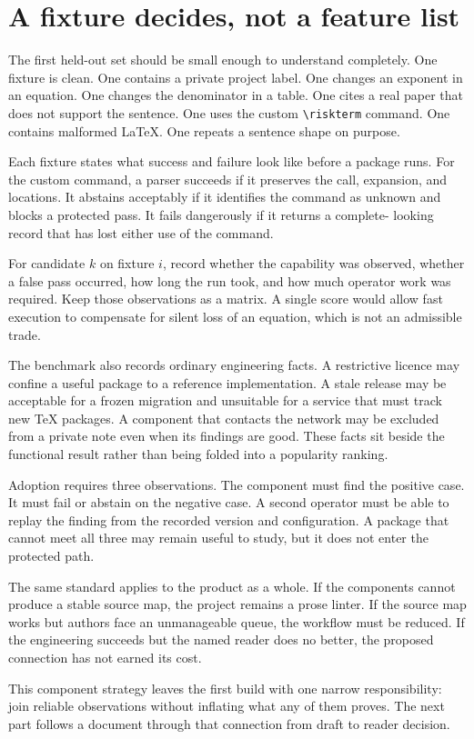 \clearpage
\section{A fixture decides, not a feature list}
\label{sec:component-fixture}

The first held-out set should be small enough to understand completely. One
fixture is clean. One contains a private project label. One changes an exponent
in an equation. One changes the denominator in a table. One cites a real paper
that does not support the sentence. One uses the custom \verb|\riskterm|
command. One contains malformed LaTeX. One repeats a sentence shape on purpose.

Each fixture states what success and failure look like before a package runs.
For the custom command, a parser succeeds if it preserves the call, expansion,
and locations. It abstains acceptably if it identifies the command as unknown
and blocks a protected pass. It fails dangerously if it returns a complete-
looking record that has lost either use of the command.

For candidate $k$ on fixture $i$, record whether the capability was observed,
whether a false pass occurred, how long the run took, and how much operator
work was required. Keep those observations as a matrix. A single score would
allow fast execution to compensate for silent loss of an equation, which is
not an admissible trade.

The benchmark also records ordinary engineering facts. A restrictive licence
may confine a useful package to a reference implementation. A stale release may
be acceptable for a frozen migration and unsuitable for a service that must
track new TeX packages. A component that contacts the network may be excluded
from a private note even when its findings are good. These facts sit beside the
functional result rather than being folded into a popularity ranking.

Adoption requires three observations. The component must find the positive
case. It must fail or abstain on the negative case. A second operator must be
able to replay the finding from the recorded version and configuration. A
package that cannot meet all three may remain useful to study, but it does not
enter the protected path.

The same standard applies to the product as a whole. If the components cannot
produce a stable source map, the project remains a prose linter. If the source
map works but authors face an unmanageable queue, the workflow must be reduced.
If the engineering succeeds but the named reader does no better, the proposed
connection has not earned its cost.

This component strategy leaves the first build with one narrow responsibility:
join reliable observations without inflating what any of them proves. The next
part follows a document through that connection from draft to reader decision.
